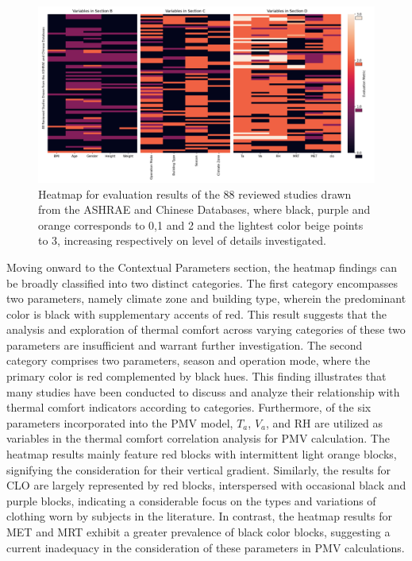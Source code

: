 \documentclass[final,3p,times,12pt]{elsarticle}
\begin{document}
\begin{figure}[h!]
    \centering
    \includegraphics[width=\linewidth]{Heatmap_All_new.jpg}
    \caption{Heatmap for evaluation results of the 88 reviewed studies drawn from the ASHRAE and Chinese Databases, where black, purple and orange corresponds to 0,1 and 2 and the lightest color beige points to 3, increasing respectively on level of details investigated.}
    \label{fig:heatmap_overall}
\end{figure}

Moving onward to the Contextual Parameters section, the heatmap findings can be broadly classified into two distinct categories. The first category encompasses two parameters, namely climate zone and building type, wherein the predominant color is black with supplementary accents of red. This result suggests that the analysis and exploration of thermal comfort across varying categories of these two parameters are insufficient and warrant further investigation. The second category comprises two parameters, season and operation mode, where the primary color is red complemented by black hues. This finding illustrates that many studies have been conducted to discuss and analyze their relationship with thermal comfort indicators according to categories. Furthermore, of the six parameters incorporated into the PMV model, $T_a$, $V_a$, and RH are utilized as variables in the thermal comfort correlation analysis for PMV calculation. The heatmap results mainly feature red blocks with intermittent light orange blocks, signifying the consideration for their vertical gradient. Similarly, the results for CLO are largely represented by red blocks, interspersed with occasional black and purple blocks, indicating a considerable focus on the types and variations of clothing worn by subjects in the literature. In contrast, the heatmap results for MET and MRT exhibit a greater prevalence of black color blocks, suggesting a current inadequacy in the consideration of these parameters in PMV calculations.
\end{document}
